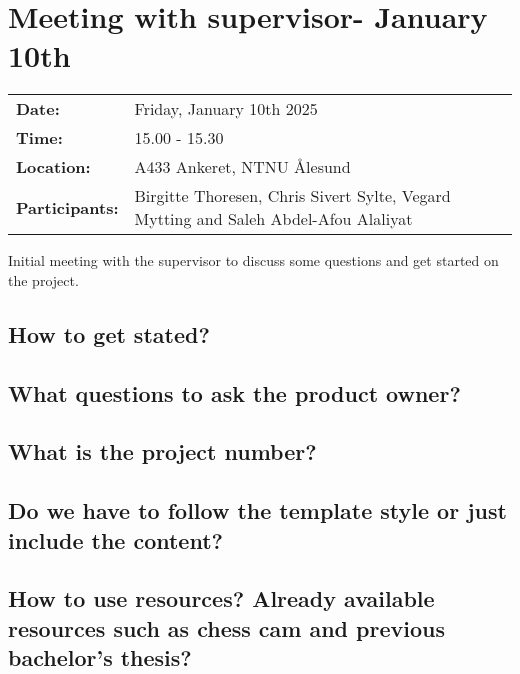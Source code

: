 \section{Meeting with supervisor- January 10th}
\begin{tabular}{ll}
    \textbf{Date:} & Friday, January 10th 2025 \\
    \textbf{Time:} & 15.00 - 15.30\\
    \textbf{Location:} & A433 Ankeret, NTNU Ålesund \\
    \textbf{Participants:} & Birgitte Thoresen, Chris Sivert Sylte, Vegard Mytting and Saleh Abdel-Afou Alaliyat\\
\end{tabular}

\vspace{0.5cm}

Initial meeting with the supervisor to discuss some questions and get started on the project.

\subsection*{How to get stated?}

\subsection*{What questions to ask the product owner?}

\subsection*{What is the project number?}

\subsection*{Do we have to follow the template style or just include the content?}

\subsection*{How to use resources? Already available resources such as chess cam and previous bachelor's thesis?}